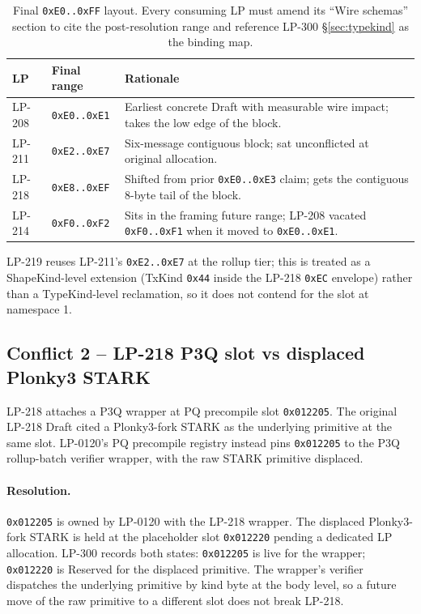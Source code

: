 \begin{table}[h]
\centering
\small
\begin{tabular}{@{}p{1.4cm}p{2.4cm}p{8.4cm}@{}}
\toprule
\textbf{LP} & \textbf{Final range} & \textbf{Rationale} \\
\midrule
LP-208 & \texttt{0xE0..0xE1} & Earliest concrete Draft with measurable wire impact; takes the low edge of the block. \\
LP-211 & \texttt{0xE2..0xE7} & Six-message contiguous block; sat unconflicted at original allocation. \\
LP-218 & \texttt{0xE8..0xEF} & Shifted from prior \texttt{0xE0..0xE3} claim; gets the contiguous 8-byte tail of the block. \\
LP-214 & \texttt{0xF0..0xF2} & Sits in the framing future range; LP-208 vacated \texttt{0xF0..0xF1} when it moved to \texttt{0xE0..0xE1}. \\
\bottomrule
\end{tabular}
\caption{Final \texttt{0xE0..0xFF} layout. Every consuming LP must
amend its ``Wire schemas'' section to cite the post-resolution range
and reference LP-300 \S\ref{sec:typekind} as the binding map.}
\label{tab:conflict1}
\end{table}

LP-219 reuses LP-211's \texttt{0xE2..0xE7} at the rollup tier; this
is treated as a ShapeKind-level extension (TxKind \texttt{0x44}
inside the LP-218 \texttt{0xEC} envelope) rather than a TypeKind-level
reclamation, so it does not contend for the slot at namespace 1.

\subsection{Conflict 2 -- LP-218 P3Q slot vs displaced Plonky3 STARK}

LP-218 attaches a P3Q wrapper at PQ precompile slot \texttt{0x012205}.
The original LP-218 Draft cited a Plonky3-fork STARK as the
underlying primitive at the same slot. LP-0120's PQ precompile
registry instead pins \texttt{0x012205} to the P3Q rollup-batch
verifier wrapper, with the raw STARK primitive displaced.

\paragraph{Resolution.} \texttt{0x012205} is owned by LP-0120 with
the LP-218 wrapper. The displaced Plonky3-fork STARK is held at the
placeholder slot \texttt{0x012220} pending a dedicated LP allocation.
LP-300 records both states: \texttt{0x012205} is live for the wrapper;
\texttt{0x012220} is Reserved for the displaced primitive. The
wrapper's verifier dispatches the underlying primitive by kind byte
at the body level, so a future move of the raw primitive to a
different slot does not break LP-218.

